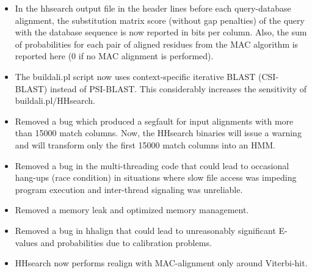 \documentclass[11pt,a4paper]{article}
\begin{document}
\begin{itemize}
\item{In the hhsearch output file in the header lines before each query-database 
  alignment, the substitution matrix score (without gap penalties) of the query 
  with the database sequence is now reported in bits per column. Also, the sum
  of probabilities for each pair of aligned residues from the MAC algorithm 
  is reported here (0 if no MAC alignment is performed).
}

\item{The buildali.pl script now uses context-specific iterative BLAST (CSI-BLAST) 
  instead of PSI-BLAST. This considerably increases the sensitivity of 
  buildali.pl/HHsearch. 
}

\item{Removed a bug which produced a segfault for input alignments with more than
  15000 match columns. Now, the HHsearch binaries will issue a warning and 
  will transform only the first 15000 match columns into an HMM.
}

\item{Removed a bug in the multi-threading code that could lead to occasional 
  hang-ups (race condition) in situations where slow file access was impeding 
  program execution and inter-thread signaling was unreliable.
}

\item{Removed a memory leak and optimized memory management.
}

\item{Removed a bug in hhalign that could lead to unreasonably significant E-values 
  and probabilities due to calibration problems.
}

\item{HHsearch now performs realign with MAC-alignment only around Viterbi-hit.
}


\end{itemize}
\end{document}
